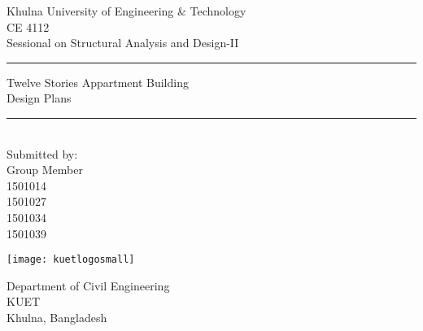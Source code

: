 \documentclass[12pt,a4paper]{article}
\begin{document}
\pagestyle{empty}
\begin{center}
	\large{Khulna University of Engineering \& Technology\\
		CE 4112\\
		Sessional on Structural Analysis and Design-II}\\[2cm]
	\hrule
		\vspace{.2cm}
		\huge{Twelve Stories Appartment Building\\
			Design Plans }\\[.2cm]
	\hrule \ \\[3cm]
	\vspace{2cm}
	\normalsize Submitted by: \large {}\\ 
	\normalsize Group Member\\ 
		1501014\\1501027\\1501034\\1501039
	\vfill
	\begin{minipage}{.5\textwidth}
		\hspace{5cm}
		\texttt{[image: kuetlogosmall]}
	\end{minipage}\hfill
	\begin{minipage}{.5\textwidth}
		\large{Department of Civil Engineering\\
		KUET\\
		Khulna, Bangladesh}
	\end{minipage}
\end{center}
\end{document}
